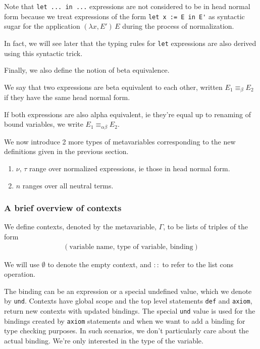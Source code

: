 \documentclass{article}
\begin{document}
Note that \verb|let ... in ...| expressions are not considered to be in head normal form
because we treat expressions of the form \verb|let x := E in E'| as syntactic
sugar for the application $(\lambda x, E') \, E$ during the process of
normalization.

In fact, we will see later that the typing rules for \verb|let|
expressions are also derived using this syntactic trick. 

Finally, we also define the notion of beta equivalence. 

\begin{definition} 
We say that two expressions are beta equivalent to each other, written
$E_1 \equiv_\beta E_2$ if they have the same head normal form.

If both expressions are also alpha equivalent, ie
they're equal up to renaming of bound variables, we write
$E_1 \equiv_{\alpha \beta} E_2$.
\end{definition}

We now introduce 2 more types of metavariables corresponding to the new definitions
given in the previous section. 

\begin{enumerate}
\item $\nu, \, \tau$ range over normalized expressions, ie those in head normal
form.
\item $n$ ranges over all neutral terms.
\end{enumerate}

\subsubsection{A brief overview of contexts}
We define contexts, denoted by the metavariable, $\Gamma$, to be lists of
triples of the form
\begin{align*}
  (\text{variable name}, \, \text{type of variable}, \, \text{binding})
\end{align*}

We will use $\emptyset$ to denote the empty context, and $::$ to refer to the
list cons operation.

The binding can be an expression or a special undefined value, which we denote by
\verb|und|.
Contexts have global scope and the top level statements \verb|def|
and \verb|axiom|, return new contexts with updated bindings.
The special \verb|und| value is used for the bindings created by \verb|axiom|
statements and when we want to add a binding for type checking purposes.
In such scenarios, we don't particularly care about the actual binding. We're
only interested in the type of the variable. 
\end{document}
